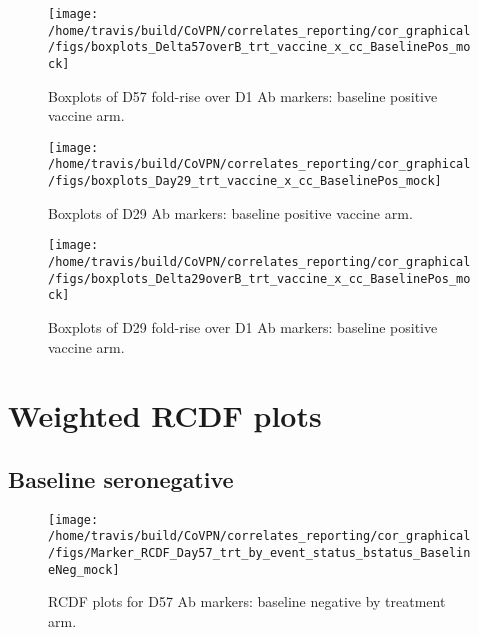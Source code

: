 \documentclass[]{book}
\theoremstyle{definition}
\theoremstyle{definition}
\theoremstyle{definition}
\newcommand{\1}{\mathbbm{1}}
\begin{document}
\clearpage
\begin{figure}[H]

{\centering \texttt{[image: /home/travis/build/CoVPN/correlates\_reporting/cor\_graphical/figs/boxplots\_Delta57overB\_trt\_vaccine\_x\_cc\_BaselinePos\_mock]} 

}

\caption{Boxplots of D57 fold-rise over D1 Ab markers: baseline positive vaccine arm.}\label{fig:unnamed-chunk-10}
\end{figure}

\clearpage
\begin{figure}[H]

{\centering \texttt{[image: /home/travis/build/CoVPN/correlates\_reporting/cor\_graphical/figs/boxplots\_Day29\_trt\_vaccine\_x\_cc\_BaselinePos\_mock]} 

}

\caption{Boxplots of D29 Ab markers: baseline positive vaccine arm.}\label{fig:unnamed-chunk-11}
\end{figure}

\clearpage
\begin{figure}[H]

{\centering \texttt{[image: /home/travis/build/CoVPN/correlates\_reporting/cor\_graphical/figs/boxplots\_Delta29overB\_trt\_vaccine\_x\_cc\_BaselinePos\_mock]} 

}

\caption{Boxplots of D29 fold-rise over D1 Ab markers: baseline positive vaccine arm.}\label{fig:unnamed-chunk-12}
\end{figure}

\clearpage

\hypertarget{weighted-rcdf-plots}{%
\section{Weighted RCDF plots}\label{weighted-rcdf-plots}}

\hypertarget{baseline-seronegative-1}{%
\subsection{Baseline seronegative}\label{baseline-seronegative-1}}

\begin{figure}[H]

{\centering \texttt{[image: /home/travis/build/CoVPN/correlates\_reporting/cor\_graphical/figs/Marker\_RCDF\_Day57\_trt\_by\_event\_status\_bstatus\_BaselineNeg\_mock]} 

}

\caption{RCDF plots for D57 Ab markers: baseline negative by treatment arm.}\label{fig:unnamed-chunk-13}
\end{figure}
\end{document}
